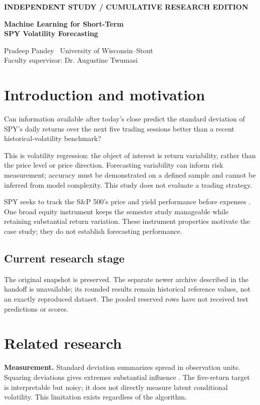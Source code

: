 \documentclass[10pt,letterpaper]{article}
\begin{document}
\thispagestyle{empty}
{\small\color{teal}\textbf{INDEPENDENT STUDY / CUMULATIVE RESEARCH EDITION}}

{\LARGE\bfseries\color{ink} Machine Learning for Short-Term\\[3pt] SPY Volatility Forecasting}

Pradeep Pandey \textbar\ University of Wisconsin--Stout\\
Faculty supervisor: Dr. Augustine Twumasi \textbar\ \ReportDate

\section{Introduction and motivation}
Can information available after today's close predict the standard deviation of
SPY's daily returns over the next five trading sessions better than a recent
historical-volatility benchmark?

This is volatility regression: the object of interest is return variability,
rather than the price level or price direction. Forecasting variability can
inform risk measurement; accuracy must be demonstrated on a defined sample and
cannot be inferred from model complexity. This study does not evaluate a trading strategy.

SPY seeks to track the S\&P 500's price and yield performance before expenses
\cite{spy}. One broad equity instrument keeps the semester study manageable
while retaining substantial return variation. These instrument properties
motivate the case study; they do not establish forecasting performance.

\subsection{Current research stage}

The original snapshot is preserved. The separate newer archive described in the
handoff is unavailable; its rounded results remain historical reference values,
not an exactly reproduced dataset. The \TestCount{} pooled reserved rows have
not received test predictions or scores.

\section{Related research}
\textbf{Measurement.} Standard deviation summarizes spread in observation units.
Squaring deviations gives extremes substantial influence \cite{nist}. The
five-return target is interpretable but noisy; it does not directly measure
latent conditional volatility. This limitation exists regardless of the algorithm.
\end{document}
